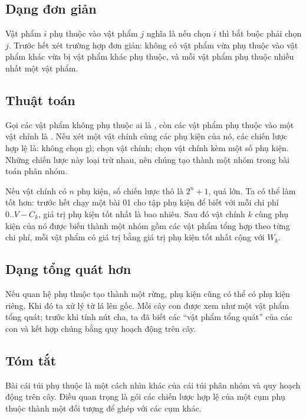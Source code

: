 \documentclass[11pt]{article}
\begin{document}
\subsection{Dạng đơn giản}

Vật phẩm \(i\) phụ thuộc vào vật phẩm \(j\) nghĩa là nếu chọn \(i\) thì bắt
buộc phải chọn \(j\). Trước hết xét trường hợp đơn giản: không có vật phẩm vừa
phụ thuộc vào vật phẩm khác vừa bị vật phẩm khác phụ thuộc, và mỗi vật phẩm
phụ thuộc nhiều nhất một vật phẩm.

\subsection{Thuật toán}

Gọi các vật phẩm không phụ thuộc ai là , còn các vật phẩm phụ
thuộc vào một vật chính là . Nếu xét một vật chính cùng các phụ
kiện của nó, các chiến lược hợp lệ là: không chọn gì; chọn vật chính; chọn vật
chính kèm một số phụ kiện. Những chiến lược này loại trừ nhau, nên chúng tạo
thành một nhóm trong bài toán phân nhóm.

Nếu vật chính có \(n\) phụ kiện, số chiến lược thô là \(2^n+1\), quá lớn. Ta
có thể làm tốt hơn: trước hết chạy một bài 01 cho tập phụ kiện để biết với
mỗi chi phí \(0..V-C_k\), giá trị phụ kiện tốt nhất là bao nhiêu. Sau đó vật
chính \(k\) cùng phụ kiện của nó được biến thành một nhóm gồm các vật phẩm
tổng hợp theo từng chi phí, mỗi vật phẩm có giá trị bằng giá trị phụ kiện tốt
nhất cộng với \(W_k\).

\subsection{Dạng tổng quát hơn}

Nếu quan hệ phụ thuộc tạo thành một rừng, phụ kiện cũng có thể có phụ kiện
riêng. Khi đó ta xử lý từ lá lên gốc. Mỗi cây con được xem như một vật phẩm
tổng quát; trước khi tính nút cha, ta đã biết các ``vật phẩm tổng quát'' của
các con và kết hợp chúng bằng quy hoạch động trên cây.

\subsection{Tóm tắt}

Bài cái túi phụ thuộc là một cách nhìn khác của cái túi phân nhóm và quy hoạch
động trên cây. Điều quan trọng là gói các chiến lược hợp lệ của một cụm phụ
thuộc thành một đối tượng để ghép với các cụm khác.
\end{document}
